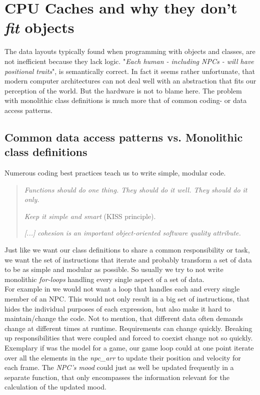 \section{CPU Caches and why they don't \textit{fit} objects}\label{cpu_caches}
The data layouts typically found when programming with objects and classes, are not inefficient because they lack logic. "\textit{Each human - including NPCs - will have positional traits}", is semantically correct. In fact it seems rather unfortunate, that modern computer architectures can not deal well with an abstraction that fits our perception of the world. But the hardware is not to blame here. The problem with monolithic class definitions is much more that of common coding- or data access patterns.\\

\subsection{Common data access patterns vs. Monolithic class definitions}\label{cdap}
Numerous coding best practices teach us to write simple, modular code.
\begin{quote}
	\textit{Functions should do one thing. They should do it well. They should do it only.} 
	
	\textit{Keep it simple and smart} (KISS principle). 
	
	\textit{[...] cohesion is an important object-oriented
		software quality attribute.}
\end{quote}
Just like we want our class definitions to share a common responsibility or task, we want the set of instructions that iterate and probably transform a set of data to be as simple and modular as possible. So usually we try to not write monolithic \textit{for-loops} handling every single aspect of a set of data.\\ For example in  we would not want a loop that handles each and every single member of an NPC. This would not only result in a big set of instructions, that hides the individual purposes of each expression, but also make it hard to maintain/change the code. Not to mention, that different data often demands change at different times at runtime. Requirements can change quickly. Breaking up responsibilities that were coupled and forced to coexist change not so quickly.\\
Exemplary if  was the model for a game, our game loop could at one point iterate over all the elements in the \textit{npc\_arr} to update their position and velocity for each frame. The \textit{NPC's mood} could just as well be updated frequently in a separate function, that only encompasses the information relevant for the calculation of the updated mood.
